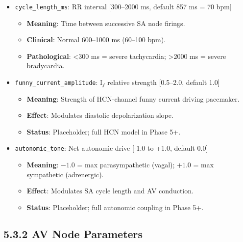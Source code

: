 \documentclass[12pt,oneside,a4paper]{book}
\newcommand{\code}[1]{\texttt{#1}}
\begin{document}
\begin{itemize}
  \item \code{cycle\_length\_ms}: RR interval [300--2000 ms, default 857 ms = 70 bpm]
    \begin{itemize}
      \item \textbf{Meaning}: Time between successive SA node firings.
      \item \textbf{Clinical}: Normal 600--1000 ms (60--100 bpm).
      \item \textbf{Pathological}: \textless 300 ms = severe tachycardia; \textgreater 2000 ms = severe bradycardia.
    \end{itemize}

  \item \code{funny\_current\_amplitude}: I$_f$ relative strength [0.5--2.0, default 1.0]
    \begin{itemize}
      \item \textbf{Meaning}: Strength of HCN-channel funny current driving pacemaker.
      \item \textbf{Effect}: Modulates diastolic depolarization slope.
      \item \textbf{Status}: Placeholder; full HCN model in Phase 5+.
    \end{itemize}

  \item \code{autonomic\_tone}: Net autonomic drive [-1.0 to +1.0, default 0.0]
    \begin{itemize}
      \item \textbf{Meaning}: $-1.0$ = max parasympathetic (vagal); $+1.0$ = max sympathetic (adrenergic).
      \item \textbf{Effect}: Modulates SA cycle length and AV conduction.
      \item \textbf{Status}: Placeholder; full autonomic coupling in Phase 5+.
    \end{itemize}
\end{itemize}

\subsection{5.3.2 AV Node Parameters}
\end{document}

